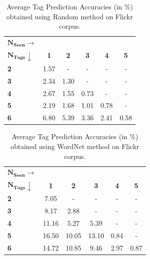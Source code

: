 \begin{table}
\fontsize{8pt}{1em}\selectfont
\begin{center}
\caption{Average Tag Prediction Accuracies (in \%) obtained using  Random method on Flickr corpus.}
\label{tab:TPFlickr117Random}
\begin{tabular}{|p{2cm}|c|c|c|c|c|}
		\hline
		{$\boldsymbol{N_{Seen} \rightarrow}$} & &  &  &  &\\ 
		{$\boldsymbol{N_{Tags}} \downarrow $} & \textbf{1} & \textbf{2} & \textbf{3} & \textbf{4} & \textbf{5}   \\ 
		\hline 		
		\textbf{2} & 1.57 & - & - & - & -\\ 
		\hline
		\textbf{3} & 2.34 & 1.30 & - & - & -\\ 
		\hline
		\textbf{4} & 2.67 & 1.55 & 0.73 & - & -\\ 
		\hline
		\textbf{5} & 2.19 & 1.68 & 1.01 & 0.78 & -\\ 
		\hline
		\textbf{6} & 6.80 & 5.39 & 3.36 & 2.41 & 0.58 \\ 
		\hline
\end{tabular}
\vspace{-2mm}
\end{center}
\end{table}
\begin{table}
\fontsize{8pt}{1em}\selectfont
\begin{center}
\caption{Average Tag Prediction Accuracies (in \%) obtained using WordNet method on Flickr corpus.} 
\label{tab:TPFlickr117Wordnet}
\begin{tabular}{|p{2cm}|c|c|c|c|c|}
		\hline
		{$\boldsymbol{N_{Seen} \rightarrow}$} & &  &  &  &\\ 
		{$\boldsymbol{ N_{Tags}} \downarrow$} & \textbf{1} & \textbf{2} & \textbf{3} & \textbf{4} & \textbf{5}   \\ 	
		\hline
		\textbf{2} & 7.05 & - & - & - & -\\ 
		\hline
		\textbf{3} & 8.17 & 2.88 & - & - & -\\ 
		\hline
		\textbf{4} & 11.16 & 5.27 & 5.39 & - & -\\ 
		\hline
		\textbf{5} & 16.50 & 10.05 & 13.10 & 0.84 & -\\ 
		\hline
		\textbf{6} & 14.72 & 10.85 & 9.46 & 2.97 & 0.87 \\ 
		\hline
\end{tabular}
\vspace{-2mm}
\end{center}
\end{table}
